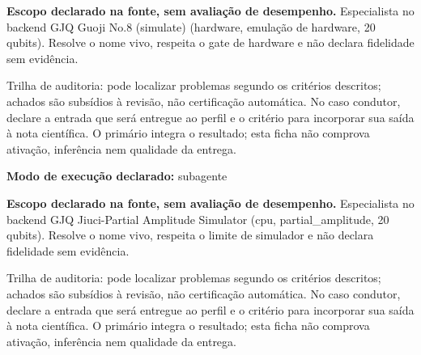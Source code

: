 
\begin{descricao}
\textbf{Escopo declarado na fonte, sem avaliação de desempenho.}
Especialista no backend GJQ Guoji No.8 (simulate) (hardware, emulação de hardware, 20 qubits). Resolve o nome vivo, respeita o gate de hardware e não declara fidelidade sem evidência.
\end{descricao}

\begin{funcao}
Trilha de auditoria: pode localizar problemas segundo os critérios descritos; achados são subsídios à revisão, não certificação automática. No caso condutor, declare a entrada que será entregue ao perfil e o critério para incorporar sua saída à nota científica. O primário integra o resultado; esta ficha não comprova ativação, inferência nem qualidade da entrega.
\end{funcao}

\begin{arquitetura}
\textbf{Modo de execução declarado:} subagente
\end{arquitetura}


\begin{descricao}
\textbf{Escopo declarado na fonte, sem avaliação de desempenho.}
Especialista no backend GJQ Jiuci-Partial Amplitude Simulator (cpu, partial\_amplitude, 20 qubits). Resolve o nome vivo, respeita o limite de simulador e não declara fidelidade sem evidência.
\end{descricao}

\begin{funcao}
Trilha de auditoria: pode localizar problemas segundo os critérios descritos; achados são subsídios à revisão, não certificação automática. No caso condutor, declare a entrada que será entregue ao perfil e o critério para incorporar sua saída à nota científica. O primário integra o resultado; esta ficha não comprova ativação, inferência nem qualidade da entrega.
\end{funcao}

